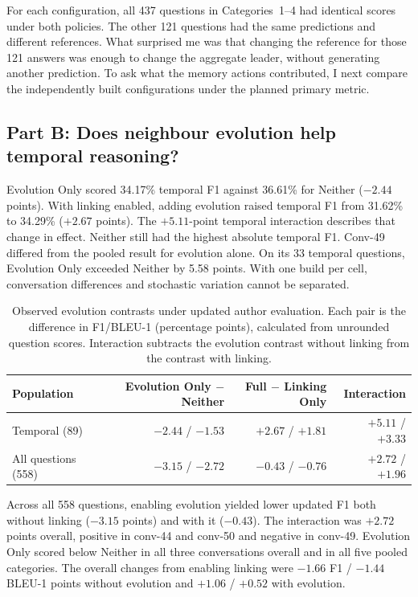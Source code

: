 \documentclass[11pt,a4paper]{article}
\begin{document}
For each configuration, all 437 questions in Categories~1–4 had identical scores under both policies. The other 121 questions had the same predictions and different references. What surprised me was that changing the reference for those 121 answers was enough to change the aggregate leader, without generating another prediction. To ask what the memory actions contributed, I next compare the independently built configurations under the planned primary metric.

\subsection{Part B: Does neighbour evolution help temporal reasoning?}
\enlargethispage{1.5\baselineskip}
Evolution Only scored 34.17\% temporal F1 against 36.61\% for Neither ($-2.44$ points). With linking enabled, adding evolution raised temporal F1 from 31.62\% to 34.29\% ($+2.67$ points). The $+5.11$-point temporal interaction describes that change in effect. Neither still had the highest absolute temporal F1. Conv-49 differed from the pooled result for evolution alone. On its 33 temporal questions, Evolution Only exceeded Neither by 5.58 points. With one build per cell, conversation differences and stochastic variation cannot be separated.

\begin{table}[H]\centering\small\setlength{\tabcolsep}{4pt}
\begin{tabular*}{\linewidth}{@{\extracolsep{\fill}}lrrr@{}}
\toprule
Population & Evolution Only $-$ Neither & Full $-$ Linking Only & Interaction \\
\midrule
Temporal (89) & $-2.44$ / $-1.53$ & $+2.67$ / $+1.81$ & $+5.11$ / $+3.33$ \\
All questions (558) & $-3.15$ / $-2.72$ & $-0.43$ / $-0.76$ & $+2.72$ / $+1.96$ \\
\bottomrule\end{tabular*}
\caption{Observed evolution contrasts under updated author evaluation. Each pair is the difference in F1/BLEU-1 (percentage points), calculated from unrounded question scores. Interaction subtracts the evolution contrast without linking from the contrast with linking.}\label{tab6}
\end{table}

Across all 558 questions, enabling evolution yielded lower updated F1 both without linking ($-3.15$ points) and with it ($-0.43$). The interaction was $+2.72$ points overall, positive in conv-44 and conv-50 and negative in conv-49. Evolution Only scored below Neither in all three conversations overall and in all five pooled categories. The overall changes from enabling linking were $-1.66$ F1 / $-1.44$ BLEU-1 points without evolution and $+1.06$ / $+0.52$ with evolution.
\end{document}
